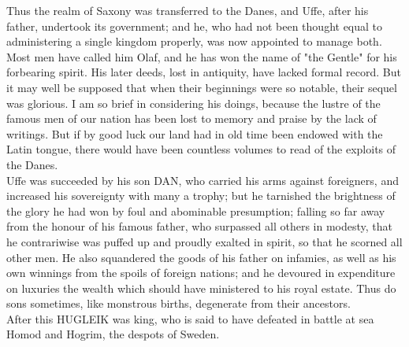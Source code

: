 \documentclass[10pt,a4paper]{report}
\begin{document}
Thus the realm of Saxony was transferred to the Danes, and Uffe, after his father, undertook its government; and he, who had not been thought equal to administering a single kingdom properly, was now appointed to manage both. Most men have called him Olaf, and he has won the name of "the Gentle" for his forbearing spirit. His later deeds, lost in antiquity, have lacked formal record. But it may well be supposed that when their beginnings were so notable, their sequel was glorious. I am so brief in considering his doings, because the lustre of the famous men of our nation has been lost to memory and praise by the lack of writings. But if by good luck our land had in old time been endowed with the Latin tongue, there would have been countless volumes to read of the exploits of the Danes.\\

Uffe was succeeded by his son DAN, who carried his arms against foreigners, and increased his sovereignty with many a trophy; but he tarnished the brightness of the glory he had won by foul and abominable presumption; falling so far away from the honour of his famous father, who surpassed all others in modesty, that he contrariwise was puffed up and proudly exalted in spirit, so that he scorned all other men. He also squandered the goods of his father on infamies, as well as his own winnings from the spoils of foreign nations; and he devoured in expenditure on luxuries the wealth which should have ministered to his royal estate. Thus do sons sometimes, like monstrous births, degenerate from their ancestors.\\

After this HUGLEIK was king, who is said to have defeated in battle at sea Homod and Hogrim, the despots of Sweden.\\
\end{document}
